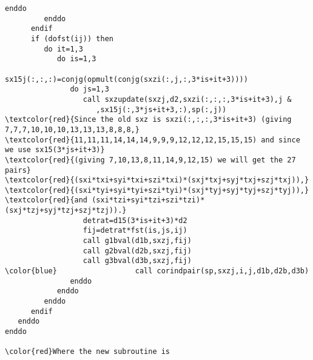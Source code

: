 \documentclass[12pt]{extarticle}
\begin{document}
\begin{Verbatim}[commandchars=\\\{\}]
            enddo
         enddo
      endif
      if (dofst(ij)) then
         do it=1,3
            do is=1,3
               sx15j(:,:,:)=conjg(opmult(conjg(sxzi(:,j,:,3*is+it+3))))
               do js=1,3
                  call sxzupdate(sxzj,d2,sxzi(:,:,:,3*is+it+3),j &
                     ,sx15j(:,3*js+it+3,:),sp(:,j))
\textcolor{red}{Since the old sxz is sxzi(:,:,:,3*is+it+3) (giving 7,7,7,10,10,10,13,13,13,8,8,8,}
\textcolor{red}{11,11,11,14,14,14,9,9,9,12,12,12,15,15,15) and since we use sx15(3*js+it+3)}
\textcolor{red}{(giving 7,10,13,8,11,14,9,12,15) we will get the 27 pairs}
\textcolor{red}{(sxi*txi+syi*txi+szi*txi)*(sxj*txj+syj*txj+szj*txj)),}
\textcolor{red}{(sxi*tyi+syi*tyi+szi*tyi)*(sxj*tyj+syj*tyj+szj*tyj)),}
\textcolor{red}{and (sxi*tzi+syi*tzi+szi*tzi)*(sxj*tzj+syj*tzj+szj*tzj)).}
                  detrat=d15(3*is+it+3)*d2
                  fij=detrat*fst(is,js,ij)
                  call g1bval(d1b,sxzj,fij)
                  call g2bval(d2b,sxzj,fij)
                  call g3bval(d3b,sxzj,fij)
\color{blue}                  call corindpair(sp,sxzj,i,j,d1b,d2b,d3b)
               enddo
            enddo
         enddo
      endif
   enddo
enddo

\color{red}Where the new subroutine is


\end{Verbatim}
\end{document}
